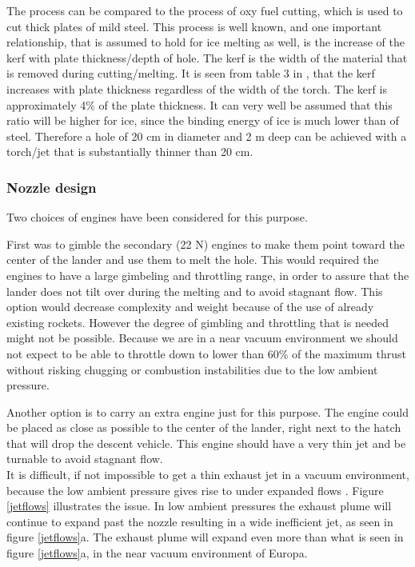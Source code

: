 The process can be compared to the process of oxy fuel cutting, which is used to cut thick plates of mild steel. This process is well known, and one important relationship, that is assumed to hold for ice melting as well, is the increase of the kerf with plate thickness/depth of hole. The kerf is the width of the material that is removed during cutting/melting. It is seen from table 3 in \cite{oxy_fuel}, that the kerf increases with plate thickness regardless of the width of the torch. The kerf is approximately 4\% of the plate thickness. It can very well be assumed that this ratio will be higher for ice, since the binding energy of ice is much lower than of steel. Therefore a hole of 20 cm in diameter and 2 m deep can be achieved  with a torch/jet that is substantially thinner than 20 cm. 

\subsubsection{Nozzle design}

Two choices of engines have been considered for this purpose. 

First was to gimble the secondary (22 N) engines to make them point toward the center of the lander and use them to melt the hole. This would required the engines to have a large gimbeling and throttling range, in order to assure that the lander does not tilt over during the melting and to avoid stagnant flow. This option would decrease complexity and weight because of the use of already existing rockets. However the degree of gimbling and throttling that is needed might not be possible. Because we are in a near vacuum environment we should not expect to be able to throttle down to lower than 60\% of the maximum thrust without risking chugging or combustion instabilities due to the low ambient pressure.

Another option is to carry an extra engine just for this purpose. The engine could be placed as close as possible to the center of the lander, right next to the hatch that will drop the descent vehicle. This engine should have a very thin jet and be turnable to avoid stagnant flow. \\

It is difficult, if not impossible to get a thin exhaust jet in a vacuum environment, because the low ambient pressure gives rise to under expanded flows \cite{spacecraft}. Figure \ref{jetflows} illustrates the issue. In low ambient pressures the exhaust plume will continue to expand past the nozzle resulting in a wide inefficient jet, as seen in figure \ref{jetflows}a. The exhaust plume will expand even more  than what is seen in figure \ref{jetflows}a, in the near vacuum environment of Europa. 

